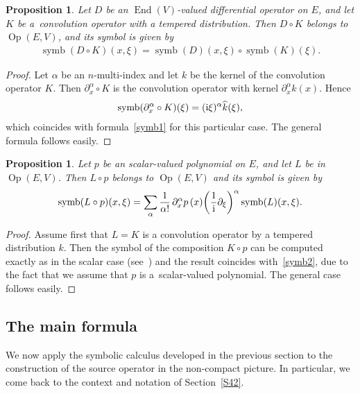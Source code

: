 \documentclass[pdftex]{sigma}
\DeclareMathOperator{\End}{End}
\DeclareMathOperator{\Op}{Op}
\DeclareMathOperator{\symb}{symb}
\numberwithin{equation}{section}
\newtheorem{prop}[theor]{Proposition}
\begin{document}
\begin{prop} %
 Let $D$ be an $\End(V)$-valued differential operator on $E$, and let $K$ be a~convolution operator with a tempered distribution. Then $D\circ K$ belongs to $\Op(E, V)$, and its symbol is given by
\begin{gather}\label{symb1}
 \symb(D\circ K)(x,\xi) = \symb(D) (x,\xi) \circ \symb(K)(\xi) .
\end{gather}
\end{prop}
\begin{proof} Let $\alpha$ be an $n$-multi-index and let $k$ be the kernel of the convolution operator $K$. Then
$\partial_x^\alpha \circ K$ is the convolution operator with kernel $\partial_x^\alpha k(x)$. Hence
\begin{gather*}
\symb(\partial_x^\alpha \circ K) (\xi) = ({\rm i}\xi)^\alpha \widehat k(\xi) ,
\end{gather*}
which coincides with formula~\eqref{symb1} for this particular case. The general formula follows easily.
\end{proof}

\begin{prop} %
 Let $p$ be an scalar-valued polynomial on $E$, and let $L$ be in $\Op(E,V)$. Then $L\circ p$ belongs to $\Op(E,V)$ and its symbol is given by
\begin{gather}\label{symb2}
\symb(L\circ p)(x,\xi) = \sum_\alpha\frac{1}{\alpha !}\, \partial_x^\alpha p\,(x) \bigg( \frac{1}{\rm i} \partial_\xi\bigg)^\alpha \symb(L)(x,\xi) .
\end{gather}
\end{prop}
\begin{proof} Assume first that $L=K$ is a convolution operator by a tempered distribution $k$. Then the symbol of the composition $K\circ p$ can be computed exactly as in the scalar case (see~\cite[Proposition~1.2]{c19}) and the result coincides with~\eqref{symb2}, due to the fact that we assume that $p$ is a~scalar-valued polynomial. The general case follows easily.
\end{proof}

\subsection{The main formula}\label{S44}

We now apply the symbolic calculus developed in the previous section to the construction of the source operator in the non-compact picture. In particular, we come back to the context and notation of Section~\ref{S42}.
\end{document}

